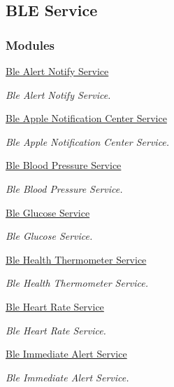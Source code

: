 \hypertarget{group___b_l_e___service}{}\subsection{B\+LE Service}
\label{group___b_l_e___service}
\subsubsection*{Modules}
\begin{DoxyCompactItemize}
\item 
\hyperlink{group___b_l_e___a_n_s}{Ble Alert Notify Service}
\begin{DoxyCompactList}\small\item\em Ble Alert Notify Service. \end{DoxyCompactList}\item 
\hyperlink{group___b_l_e___a_n_c_s}{Ble Apple Notification Center Service}
\begin{DoxyCompactList}\small\item\em Ble Apple Notification Center Service. \end{DoxyCompactList}\item 
\hyperlink{group___b_l_e___b_p_s}{Ble Blood Pressure Service}
\begin{DoxyCompactList}\small\item\em Ble Blood Pressure Service. \end{DoxyCompactList}\item 
\hyperlink{group___b_l_e___g_s}{Ble Glucose Service}
\begin{DoxyCompactList}\small\item\em Ble Glucose Service. \end{DoxyCompactList}\item 
\hyperlink{group___b_l_e___h_t_s}{Ble Health Thermometer Service}
\begin{DoxyCompactList}\small\item\em Ble Health Thermometer Service. \end{DoxyCompactList}\item 
\hyperlink{group___b_l_e___h_r_s}{Ble Heart Rate Service}
\begin{DoxyCompactList}\small\item\em Ble Heart Rate Service. \end{DoxyCompactList}\item 
\hyperlink{group___b_l_e___i_a_s}{Ble Immediate Alert Service}
\begin{DoxyCompactList}\small\item\em Ble Immediate Alert Service. \end{DoxyCompactList}\item 

\end{DoxyCompactItemize}
